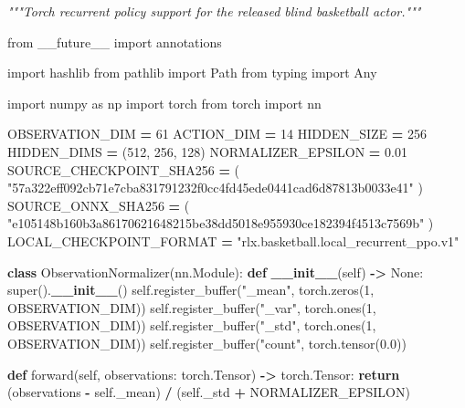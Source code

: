 \documentclass[
  american,
  11pt,
  letterpaper,
]{article}
\newenvironment{Shaded}{\begin{snugshade}}{\end{snugshade}}
\newcommand{\BuiltInTok}[1]{#1}
\newcommand{\CommentTok}[1]{\textcolor[rgb]{0.56,0.35,0.01}{\textit{#1}}}
\newcommand{\ControlFlowTok}[1]{\textcolor[rgb]{0.13,0.29,0.53}{\textbf{#1}}}
\newcommand{\DecValTok}[1]{\textcolor[rgb]{0.00,0.00,0.81}{#1}}
\newcommand{\FloatTok}[1]{\textcolor[rgb]{0.00,0.00,0.81}{#1}}
\newcommand{\FunctionTok}[1]{\textcolor[rgb]{0.13,0.29,0.53}{\textbf{#1}}}
\newcommand{\ImportTok}[1]{#1}
\newcommand{\KeywordTok}[1]{\textcolor[rgb]{0.13,0.29,0.53}{\textbf{#1}}}
\newcommand{\NormalTok}[1]{#1}
\newcommand{\OperatorTok}[1]{\textcolor[rgb]{0.81,0.36,0.00}{\textbf{#1}}}
\newcommand{\StringTok}[1]{\textcolor[rgb]{0.31,0.60,0.02}{#1}}
\newcommand{\VariableTok}[1]{\textcolor[rgb]{0.00,0.00,0.00}{#1}}
\renewenvironment{Shaded}{\par\smallskip}{\par\smallskip}
\begin{document}
\begin{Shaded}
\begin{Highlighting}[]
\CommentTok{"""Torch recurrent policy support for the released blind basketball actor."""}

\ImportTok{from}\NormalTok{ \_\_future\_\_ }\ImportTok{import}\NormalTok{ annotations}

\ImportTok{import}\NormalTok{ hashlib}
\ImportTok{from}\NormalTok{ pathlib }\ImportTok{import}\NormalTok{ Path}
\ImportTok{from}\NormalTok{ typing }\ImportTok{import}\NormalTok{ Any}

\ImportTok{import}\NormalTok{ numpy }\ImportTok{as}\NormalTok{ np}
\ImportTok{import}\NormalTok{ torch}
\ImportTok{from}\NormalTok{ torch }\ImportTok{import}\NormalTok{ nn}

\NormalTok{OBSERVATION\_DIM }\OperatorTok{=} \DecValTok{61}
\NormalTok{ACTION\_DIM }\OperatorTok{=} \DecValTok{14}
\NormalTok{HIDDEN\_SIZE }\OperatorTok{=} \DecValTok{256}
\NormalTok{HIDDEN\_DIMS }\OperatorTok{=}\NormalTok{ (}\DecValTok{512}\NormalTok{, }\DecValTok{256}\NormalTok{, }\DecValTok{128}\NormalTok{)}
\NormalTok{NORMALIZER\_EPSILON }\OperatorTok{=} \FloatTok{0.01}
\NormalTok{SOURCE\_CHECKPOINT\_SHA256 }\OperatorTok{=}\NormalTok{ (}
    \StringTok{"57a322eff092cb71e7cba831791232f0cc4fd45ede0441cad6d87813b0033e41"}
\NormalTok{)}
\NormalTok{SOURCE\_ONNX\_SHA256 }\OperatorTok{=}\NormalTok{ (}
    \StringTok{"e105148b160b3a86170621648215be38dd5018e955930ce182394f4513c7569b"}
\NormalTok{)}
\NormalTok{LOCAL\_CHECKPOINT\_FORMAT }\OperatorTok{=} \StringTok{"rlx.basketball.local\_recurrent\_ppo.v1"}


\KeywordTok{class}\NormalTok{ ObservationNormalizer(nn.Module):}
    \KeywordTok{def} \FunctionTok{\_\_init\_\_}\NormalTok{(}\VariableTok{self}\NormalTok{) }\OperatorTok{{-}\textgreater{}} \VariableTok{None}\NormalTok{:}
        \BuiltInTok{super}\NormalTok{().}\FunctionTok{\_\_init\_\_}\NormalTok{()}
        \VariableTok{self}\NormalTok{.register\_buffer(}\StringTok{"\_mean"}\NormalTok{, torch.zeros(}\DecValTok{1}\NormalTok{, OBSERVATION\_DIM))}
        \VariableTok{self}\NormalTok{.register\_buffer(}\StringTok{"\_var"}\NormalTok{, torch.ones(}\DecValTok{1}\NormalTok{, OBSERVATION\_DIM))}
        \VariableTok{self}\NormalTok{.register\_buffer(}\StringTok{"\_std"}\NormalTok{, torch.ones(}\DecValTok{1}\NormalTok{, OBSERVATION\_DIM))}
        \VariableTok{self}\NormalTok{.register\_buffer(}\StringTok{"count"}\NormalTok{, torch.tensor(}\FloatTok{0.0}\NormalTok{))}

    \KeywordTok{def}\NormalTok{ forward(}\VariableTok{self}\NormalTok{, observations: torch.Tensor) }\OperatorTok{{-}\textgreater{}}\NormalTok{ torch.Tensor:}
        \ControlFlowTok{return}\NormalTok{ (observations }\OperatorTok{{-}} \VariableTok{self}\NormalTok{.\_mean) }\OperatorTok{/}\NormalTok{ (}\VariableTok{self}\NormalTok{.\_std }\OperatorTok{+}\NormalTok{ NORMALIZER\_EPSILON)}



\end{Highlighting}
\end{Shaded}
\end{document}
